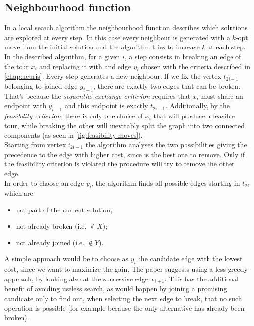 \subsection{Neighbourhood function}
\label{ssec:neighbourhood}
In a local search algorithm the neighbourhood function describes which solutions are explored at every step. In this case every neighbour is generated with a $k$-opt move from the initial solution and the algorithm tries to increase $k$ at each step.\\
In the described algorithm, for a given $i$, a step consists in breaking an edge of the tour $x_i$ and replacing it with  and edge $y_i$ chosen with the criteria described in \cref{chap:heuris}. Every step generates a new neighbour.
If we fix the vertex $t_{2i-1}$ belonging to joined edge $y_{i-1}$, there are exactly two edges that can be broken. That's because the \emph{sequential exchange criterion} requires that $x_i$ must share an endpoint with $y_{i-1}$ and this endpoint is exactly $t_{2i-1}$. Additionally, by the \emph{feasibility criterion}, there is only one choice of $x_i$ that will produce a feasible tour, while breaking the other will inevitably split the graph into two connected components (as seen in \cref{fig:feasibility-moves}). \\
Starting from vertex $t_{2i-1}$ the algorithm analyses the two possibilities giving the precedence to the edge with higher cost, since is the best one to remove. Only if the feasibility criterion is violated the procedure will try to remove the other edge.\\
In order to choose an edge $y_i$, the algorithm finds all possible edges starting in $t_{2i}$ which are
\begin{itemize}
	\setlength\itemsep{0.05em}
	\item not part of the current solution;
	\item not already broken (i.e. $\notin X$);
	\item not already joined (i.e. $\notin Y$).
\end{itemize}
A simple approach would be to choose as $y_i$ the candidate edge with the lowest cost, since we want to maximize the gain. The paper suggests using a less greedy approach, by looking also at the successive edge $x_{i+1}$. This has the additional benefit of avoiding useless search, as would happen by joining a promising candidate only to find out, when selecting the next edge to break, that no such operation is possible (for example because the only alternative has already been broken). \\
